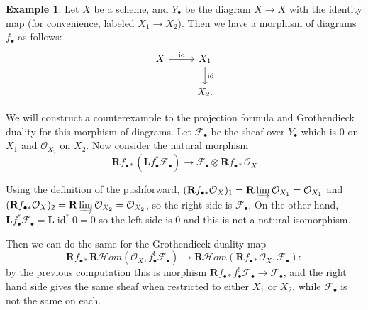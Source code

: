 \documentclass{report}
\theoremstyle{definition}
\newtheorem{example}[theorem]{Example}
\newcommand{\cHom}{\mathcal{H} \textit{om}}
\DeclareMathOperator{\id}{id}
\newcommand{\FF}{\mathscr{F}}
\newcommand{\bL}{\textbf{L}}
\newcommand{\OO}{\mathcal{O}}
\newcommand{\bR}{\textbf{R}}
\begin{document}
\begin{example}
	Let $X$ be a scheme, and $Y_\bullet$ be the diagram $X \rightarrow X$ with the identity map (for convenience, labeled $X_1 \rightarrow X_2$).
	Then we have a morphism of diagrams $f_\bullet$ as follows:
	\[
	\begin{tikzcd}
		X \arrow{r}{\id} & X_1 \arrow{d}{\id} \\
		& X_2.
	\end{tikzcd}
	\]
	
	We will construct a counterexample to the projection formula and Grothendieck duality for this morphism of diagrams.
	Let $\FF_\bullet$ be the sheaf over $Y_\bullet$ which is 0 on $X_1$ and $\OO_{X_2}$ on $X_2$.
	Now consider the natural morphism
	\[
		\bR f_{\bullet *} (\bL f_\bullet^* \FF_\bullet) \rightarrow \FF_\bullet \otimes \bR f_{\bullet *} \OO_X
	\]
	
	Using the definition of the pushforward, $(\bR f_{\bullet *} \OO_X)_1 = \bR \varinjlim \OO_{X_1} = \OO_{X_1}$ and $(\bR f_{\bullet *} \OO_X)_2 = \bR \varinjlim \OO_{X_2} = \OO_{X_2}$, so the right side is $\FF_\bullet$.
	On the other hand, $\bL f_\bullet^* \FF_\bullet = \bL \id^* 0 = 0$ so the left side is 0 and this is not a natural isomorphism.
	
	Then we can do the same for the Grothendieck duality map
	\[
		\bR f_{\bullet *} \bR \cHom(\OO_X, f_\bullet^! \FF_\bullet) \rightarrow \bR \cHom(\bR f_{\bullet *} \OO_X , \FF_\bullet):
	\]
	by the previous computation this is morphism $\bR f_{\bullet *} f_\bullet^! \FF_\bullet \rightarrow \FF_\bullet$, and the right hand side gives the same sheaf when restricted to either $X_1$ or $X_2$, while $\FF_\bullet$ is not the same on each.
\end{example}
\end{document}

